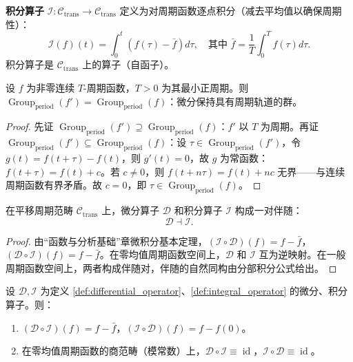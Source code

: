 \begin{definition}[积分算子]\label{def:integral_operator}
\textbf{积分算子} $\mathcal{I}: \mathcal{C}_{\text{trans}} \to \mathcal{C}_{\text{trans}}$ 定义为对周期函数逐点积分（减去平均值以确保周期性）：
\[
\mathcal{I}(f)(t) = \int_0^t (f(\tau) - \bar{f}) d\tau, \quad \text{其中 } \bar{f} = \frac{1}{T}\int_0^T f(\tau) d\tau.
\]
积分算子是 $\mathcal{C}_{\text{trans}}$ 上的算子（自函子）。
\end{definition}

\begin{lemma}[微分不改变具有周期轨道的群]\label{ch13_derivative_period_lemma}
设 $f$ 为非零连续 $T$-周期函数，$T > 0$ 为其最小正周期。则 $\operatorname{Group}_{\mathrm{period}}(f') = \operatorname{Group}_{\mathrm{period}}(f)$：微分保持具有周期轨道的群。
\end{lemma}

\begin{proof}
先证 $\operatorname{Group}_{\mathrm{period}}(f') \supseteq \operatorname{Group}_{\mathrm{period}}(f)$：$f'$ 以 $T$ 为周期。再证 $\operatorname{Group}_{\mathrm{period}}(f') \subseteq \operatorname{Group}_{\mathrm{period}}(f)$：设 $\tau \in \operatorname{Group}_{\mathrm{period}}(f')$，令 $g(t) = f(t+\tau) - f(t)$，则 $g'(t) = 0$，故 $g$ 为常函数：$f(t+\tau) = f(t) + c$。若 $c \neq 0$，则 $f(t + n\tau) = f(t) + nc$ 无界——与连续周期函数有界矛盾。故 $c = 0$，即 $\tau \in \operatorname{Group}_{\mathrm{period}}(f)$。
\end{proof}

\begin{theorem}[微分与积分的伴随性]\label{thm:diff_int_adjunction}
在平移周期范畴 $\mathcal{C}_{\text{trans}}$ 上，微分算子 $\mathcal{D}$ 和积分算子 $\mathcal{I}$ 构成一对伴随：
\[
\mathcal{D} \dashv \mathcal{I}.
\]
\end{theorem}

\begin{proof}
由“函数与分析基础”章微积分基本定理，$(\mathcal{I} \circ \mathcal{D})(f) = f - \bar{f}$，$(\mathcal{D} \circ \mathcal{I})(f) = f - \bar{f}$。在零均值周期函数空间上，$\mathcal{D}$ 和 $\mathcal{I}$ 互为逆映射。在一般周期函数空间上，两者构成伴随对，伴随的自然同构由分部积分公式给出。
\end{proof}

\begin{lemma}[微分与积分在商范畴上互为严格逆]\label{ch13_diff_int_inverse_lemma}
设 $\mathcal{D}, \mathcal{I}$ 为定义 \ref{def:differential_operator}、\ref{def:integral_operator} 的微分、积分算子。则：
\begin{enumerate}[label=(\roman*)]
    \item $(\mathcal{D} \circ \mathcal{I})(f) = f - \bar{f}$，$(\mathcal{I} \circ \mathcal{D})(f) = f - f(0)$。
    \item 在零均值周期函数的商范畴（模常数）上，$\mathcal{D} \circ \mathcal{I} \equiv \operatorname{id}$，$\mathcal{I} \circ \mathcal{D} \equiv \operatorname{id}$。
\end{enumerate}
\end{lemma}

